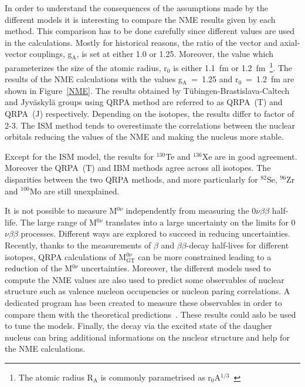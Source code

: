 \documentclass[main.tex]{subfiles}
\begin{document}
\NI In order to understand the consequences of the assumptions made by the different models it is interesting to compare the NME results given by each method. This comparison has to be done carefully since different values are used in the calculations. Mostly for historical reasons, the ratio of the vector and axial-vector couplings, g$_{\text{A}}$, is set at either 1.0 or 1.25. Moreover, the value which parameterizes the size of the atomic radius, r$_0$ is either 1.1~fm or 1.2~fm~\footnote{The atomic radius R$_\text{A}$ is commonly parametrised as r$_0$A$^{\text{1/3}}$~\cite{RadiusNucleus}}. The results of the NME calculations with the values g$_{\text{A}}$~=~1.25 and r$_0$~=~1.2~fm are shown in Figure~\ref{NME}. The results obtained by Tübingen-Brastislava-Caltech and Jyväskylä groups using QRPA method are referred to as QRPA~(T) and QRPA~(J) respectively. Depending on the isotopes, the results differ to factor of 2-3. The ISM method tends to overestimate the correlations between the nuclear orbitals reducing the values of the NME and making the nucleus more stable. 


\bigskip


\NI Except for the ISM model, the results for $^{\text{130}}$Te and $^{\text{136}}$Xe are in good agreement. Moreover the QRPA~(T) and IBM methods agree across all isotopes. The disparities between the two QRPA methods, and more particularly for $^{\text{82}}$Se, $^{\text{96}}$Zr and $^{\text{100}}$Mo are still unexplained. 


\bigskip


\NI It is not possible to measure M$^{0\nu}$  independently from measuring the 0$\nu\beta\beta$ half-life. The large range of M$^{0\nu}$ translates into a large uncertainty on the limits for 0$\nu\beta\beta$ processes. Different ways are explored to succeed in reducing uncertainties. Recently, thanks to the measurements of $\beta$ and $\beta\beta$-decay half-lives for different isotopes, QRPA calculations of M$_{\text{GT}}^{0\nu}$ can be more constrained leading to a reduction of the M$^{0\nu}$ uncertainties. Moreover, the different models used to compute the NME values are also used to predict some observables of nuclear structure such as valence nucleon occupencies or nucleon paring correlations. A dedicated program has been created to measure these observables in order to compare them with the theoretical predictions~\cite{ReduceNMEuncertainties}. These results could aslo be used to tune the models. Finally, the decay via the excited state of the daugher nucleus can bring additional informations on the nuclear structure and help for the NME calculations. 
\end{document}
